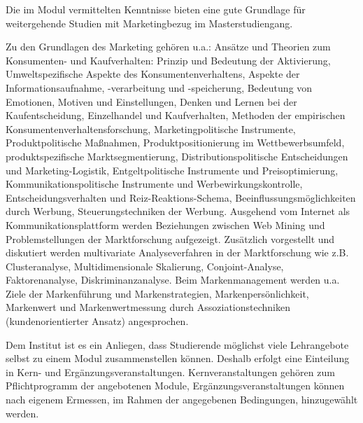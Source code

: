 \begin{module}
\begin{learningoutcomes}
Die im Modul vermittelten Kenntnisse bieten eine gute Grundlage für weitergehende Studien mit Marketingbezug im Masterstudiengang.


\end{learningoutcomes}

\begin{content}
Zu den Grundlagen des Marketing gehören u.a.: Ansätze und Theorien zum Konsumenten- und Kaufverhalten: Prinzip und Bedeutung der Aktivierung, Umweltspezifische Aspekte des Konsumentenverhaltens, Aspekte der Informationsaufnahme, -verarbeitung und -speicherung, Bedeutung von Emotionen, Motiven und Einstellungen, Denken und Lernen bei der Kaufentscheidung, Einzelhandel und Kaufverhalten, Methoden der empirischen Konsumentenverhaltensforschung, Marketingpolitische Instrumente, Produktpolitische Maßnahmen, Produktpositionierung im Wettbewerbsumfeld, produktspezifische Marktsegmentierung, Distributionspolitische Entscheidungen und Marketing-Logistik, Entgeltpolitische Instrumente und Preisoptimierung, Kommunikationspolitische Instrumente und Werbewirkungskontrolle, Entscheidungsverhalten und Reiz-Reaktions-Schema, Beeinflussungsmöglichkeiten durch Werbung, Steuerungstechniken der Werbung.\newline
Ausgehend vom Internet als Kommunikationsplattform werden Beziehungen zwischen Web Mining und Problemstellungen der Marktforschung aufgezeigt. Zusätzlich vorgestellt und diskutiert werden multivariate Analyseverfahren in der Marktforschung wie z.B. Clusteranalyse, Multidimensionale Skalierung, Conjoint-Analyse, Faktorenanalyse, Diskriminanzanalyse.\newline
Beim Markenmanagement werden u.a. Ziele der Markenführung und Markenstrategien, Markenpersönlichkeit, Markenwert und Markenwertmessung durch Assoziationstechniken (kundenorientierter Ansatz) angesprochen.

 

Dem Institut ist es ein Anliegen, dass Studierende möglichst viele Lehrangebote selbst zu einem Modul zusammenstellen können. Deshalb erfolgt eine Einteilung in Kern- und Ergänzungsveranstaltungen. Kernveranstaltungen gehören zum Pflichtprogramm der angebotenen Module, Ergänzungsveranstaltungen können nach eigenem Ermessen, im Rahmen der angegebenen Bedingungen, hinzugewählt werden.


\end{content}



\end{module}

